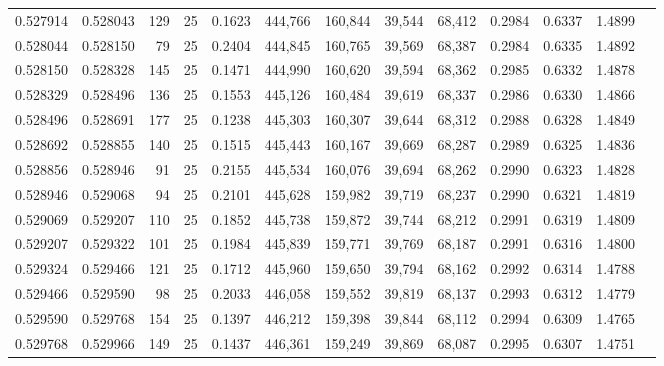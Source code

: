 \begin{tabular}{rrrrrrrrrrrrr}
0.527914 & 0.528043 &   129 &  25 &                                     0.1623 & 444,766 & 160,844 &  39,544 &  68,412 & 0.2984 & 0.6337 & 1.4899 \\
0.528044 & 0.528150 &    79 &  25 &                                     0.2404 & 444,845 & 160,765 &  39,569 &  68,387 & 0.2984 & 0.6335 & 1.4892 \\
0.528150 & 0.528328 &   145 &  25 &                                     0.1471 & 444,990 & 160,620 &  39,594 &  68,362 & 0.2985 & 0.6332 & 1.4878 \\
0.528329 & 0.528496 &   136 &  25 &                                     0.1553 & 445,126 & 160,484 &  39,619 &  68,337 & 0.2986 & 0.6330 & 1.4866 \\
0.528496 & 0.528691 &   177 &  25 &                                     0.1238 & 445,303 & 160,307 &  39,644 &  68,312 & 0.2988 & 0.6328 & 1.4849 \\
0.528692 & 0.528855 &   140 &  25 &                                     0.1515 & 445,443 & 160,167 &  39,669 &  68,287 & 0.2989 & 0.6325 & 1.4836 \\
0.528856 & 0.528946 &    91 &  25 &                                     0.2155 & 445,534 & 160,076 &  39,694 &  68,262 & 0.2990 & 0.6323 & 1.4828 \\
0.528946 & 0.529068 &    94 &  25 &                                     0.2101 & 445,628 & 159,982 &  39,719 &  68,237 & 0.2990 & 0.6321 & 1.4819 \\
0.529069 & 0.529207 &   110 &  25 &                                     0.1852 & 445,738 & 159,872 &  39,744 &  68,212 & 0.2991 & 0.6319 & 1.4809 \\
0.529207 & 0.529322 &   101 &  25 &                                     0.1984 & 445,839 & 159,771 &  39,769 &  68,187 & 0.2991 & 0.6316 & 1.4800 \\
0.529324 & 0.529466 &   121 &  25 &                                     0.1712 & 445,960 & 159,650 &  39,794 &  68,162 & 0.2992 & 0.6314 & 1.4788 \\
0.529466 & 0.529590 &    98 &  25 &                                     0.2033 & 446,058 & 159,552 &  39,819 &  68,137 & 0.2993 & 0.6312 & 1.4779 \\
0.529590 & 0.529768 &   154 &  25 &                                     0.1397 & 446,212 & 159,398 &  39,844 &  68,112 & 0.2994 & 0.6309 & 1.4765 \\
0.529768 & 0.529966 &   149 &  25 &                                     0.1437 & 446,361 & 159,249 &  39,869 &  68,087 & 0.2995 & 0.6307 & 1.4751 \\

\end{tabular}
